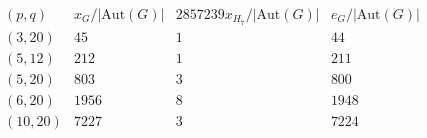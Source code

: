 \[\begin{array}{c|rrr}
(p,q)&x_G/|\mathrm{Aut}(G)|&2857239x_{H_7}/|\mathrm{Aut}(G)|&e_G/|\mathrm{Aut}(G)|\\\hline
(3,20)&45&1&44\\
(5,12)&212&1&211\\
(5,20)&803&3&800\\
(6,20)&1956&8&1948\\
(10,20)&7227&3&7224\\
\end{array}\]
